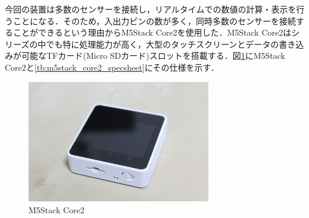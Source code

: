 今回の装置は多数のセンサーを接続し，リアルタイムでの数値の計算・表示を行うことになる．そのため，入出力ピンの数が多く，同時多数のセンサーを接続することができるという理由からM5Stack Core2を使用した．M5Stack Core2はシリーズの中でも特に処理能力が高く，大型のタッチスクリーンとデータの書き込みが可能なTFカード(Micro SDカード)スロットを搭載する．図\ref{fig:m5stack_core2}にM5Stack Core2と\ref{tb:m5stack_core2_specsheet}にその仕様を示す．

\begin{figure}[H]
  \begin{center}
    \includegraphics[width=8cm]{fig/m5stack_core2}
    \caption{M5Stack Core2}
    \label{fig:m5stack_core2}
  \end{center}
\end{figure}

